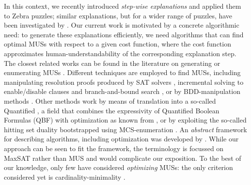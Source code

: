 In this context, we recently introduced \emph{step-wise explanations} \cite{ecai/BogaertsGCG20} and applied them to Zebra puzzles; similar explanations, but for a wider range of puzzles, have been investigated by \citet{schotten}. 
Our current work is motivated by a concrete algorithmic need: to generate these explanations efficiently, we need algorithms that can find optimal MUSs with respect to a given cost function, where the cost function approximates human-understandability of the corresponding explanation step. 
The closest related works can be found in the literature on generating or enumerating MUSs \cite{conf/sat/LynceM04,liffiton2016fast}.
Different techniques are employed to find MUSs, including  manipulating resolution proofs produced by SAT solvers \cite{goldberg,DBLP:journals/fmsd/GershmanKS08,DBLP:conf/sat/DershowitzHN06}, incremental solving to enable/disable clauses and branch-and-bound search \cite{DBLP:conf/dac/OhMASM04}, or by BDD-manipulation methods \cite{huang}.
Other methods work by means of translation into a so-called Quantified \maxsat \cite{DBLP:journals/constraints/IgnatievJM16}, a field that combines the expressivity of Quantified Boolean Formulas (QBF)  with optimization as known from \maxsat {}, or by exploiting the so-called hitting set duality \cite{ignatiev2015smallest} bootstrapped using MCS-enumeration \cite{marques2020reasoning}. 
An \textit{abstract} framework for describing \hitsetbased algorithms, including optimization was developed by \citet{DBLP:conf/kr/SaikkoWJ16}. While our approach can be seen to fit the framework, the terminology is focussed on MaxSAT rather than MUS and would complicate our exposition.
To the best of our knowledge, only few have considered \emph{optimizing} MUSs: the only criterion considered yet is cardinality-minimality \cite{conf/sat/LynceM04,ignatiev2015smallest}. 



